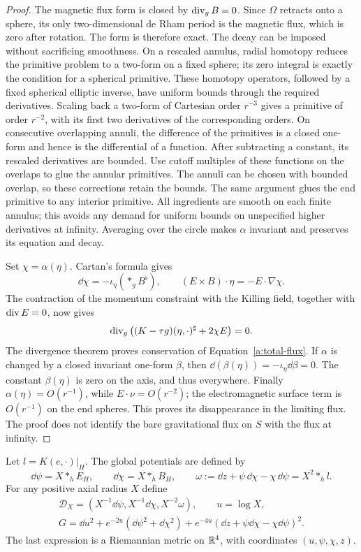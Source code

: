 \begin{proof}
The magnetic flux form is closed by $\operatorname{div}_gB=0$.  Since
$\Omega$ retracts onto a sphere, its only two-dimensional de Rham
period is the magnetic flux, which is zero after rotation.  The form
is therefore exact.  The decay can be imposed without sacrificing
smoothness.  On a rescaled annulus, radial homotopy reduces the
primitive problem to a two-form on a fixed sphere; its zero integral
is exactly the condition for a spherical primitive.  These homotopy
operators, followed by a fixed spherical elliptic inverse, have
uniform bounds through the required derivatives.  Scaling back a
two-form of Cartesian order $r^{-3}$ gives a primitive of order
$r^{-2}$, with its first two derivatives of the corresponding orders.
On consecutive overlapping annuli, the difference of the primitives
is a closed one-form and hence is the differential of a function.
After subtracting a constant, its rescaled derivatives are bounded.
Use cutoff multiples of these functions on the overlaps to glue the
annular primitives.  The annuli can be chosen with bounded overlap,
so these corrections retain the bounds.  The same argument glues the
end primitive to any interior primitive.  All ingredients are smooth
on each finite annulus; this avoids any demand for uniform bounds on
unspecified higher derivatives at infinity.  Averaging over the
circle makes $\alpha$ invariant and preserves its equation and decay.

Set $\chi=\alpha(\eta)$.  Cartan's formula gives
\[
 \dd\chi=-\iota_\eta(*_gB^\flat),
 \qquad (E\times B)\cdot\eta=-E\cdot\nabla\chi.
\]
The contraction of the momentum constraint with the Killing field,
together with $\operatorname{div} E=0$, now gives
\[
 \operatorname{div}_g\big((K-\tau g)(\eta,\cdot)^\sharp+2\chi E\big)=0.
\]
The divergence theorem proves conservation of
Equation~\eqref{a:total-flux}.  If $\alpha$ is changed by a closed
invariant one-form $\beta$, then
$\dd(\beta(\eta))=-\iota_\eta\dd\beta=0$.
The constant $\beta(\eta)$ is zero on the axis, and thus everywhere.
Finally $\alpha(\eta)=O(r^{-1})$, while $E\cdot\nu=O(r^{-2})$;
the electromagnetic surface term is $O(r^{-1})$ on the end spheres.
This proves its disappearance in the limiting flux.  The proof does
not identify the bare gravitational flux on $S$ with the flux at
infinity.
\end{proof}

Let $l=K(e,\cdot)|_H$.  The global potentials are defined by
\begin{equation}\label{a:potentials}
 \dd\psi=X*_hE_H,\qquad
 \dd\chi=X*_hB_H,\qquad
 \omega:=\dd z+\psi\,\dd\chi-\chi\,\dd\psi=X^2*_h l.
\end{equation}
For any positive axial radius $X$ define
\begin{equation}\label{a:target}
 \begin{gathered}
 \mathcal D_X=(X^{-1}\dd\psi,X^{-1}\dd\chi,X^{-2}\omega),
 \qquad u=\log X,\\
 G=\dd u^2+e^{-2u}(\dd\psi^2+\dd\chi^2)
       +e^{-4u}(\dd z+\psi\dd\chi-\chi\dd\psi)^2.
 \end{gathered}
\end{equation}
The last expression is a Riemannian metric on $\mathbb R^4$, with
coordinates $(u,\psi,\chi,z)$.


